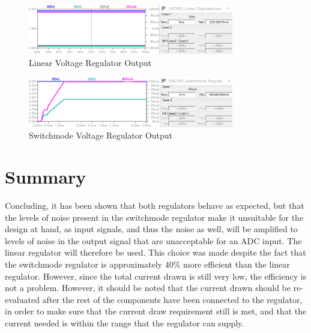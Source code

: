 \begin{figure}[h]
    \centering
    \includegraphics[width = 0.8\textwidth]{Figures/lmout.png}
    \caption{Linear Voltage Regulator Output}
    \label{fig:lmout}
\end{figure}

\begin{figure}[h]
    \centering
    \includegraphics[width = 0.8\textwidth]{Figures/smout.png}
    \caption{Switchmode Voltage Regulator Output}
    \label{fig:smout}
\end{figure}

\section{Summary}\label{sec:temp_summary}
Concluding, it has been shown that both regulators behave as expected, but that the levels of noise present in the switchmode regulator make it unsuitable for the design at hand, as input signals, and thus the noise as well, will be amplified to levels of noise in the output signal that are unacceptable for an ADC input. The linear regulator will therefore be used. This choice was made despite the fact that the switchmode regulator is approximately 40\% more efficient than the linear regulator. However, since the total current drawn is still very low, the efficiency is not a problem. However, it should be noted that the current drawn should be re-evaluated after the rest of the components have been connected to the regulator, in order to make sure that the current draw requirement still is met, and that the current needed is within the range that the regulator can supply.